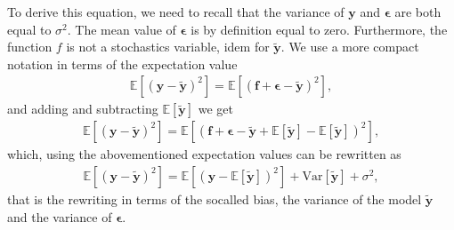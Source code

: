 \documentclass[letterpaper,10pt,english]{sphinxmanual}
\begin{document}
To derive this equation, we need to recall that the variance of \(\boldsymbol{y}\) and \(\boldsymbol{\epsilon}\) are both equal to \(\sigma^2\). The mean value of \(\boldsymbol{\epsilon}\) is by definition equal to zero. Furthermore, the function \(f\) is not a stochastics variable, idem for \(\boldsymbol{\tilde{y}}\).
We use a more compact notation in terms of the expectation value
\begin{equation*}
\begin{split}
\mathbb{E}\left[(\boldsymbol{y}-\boldsymbol{\tilde{y}})^2\right]=\mathbb{E}\left[(\boldsymbol{f}+\boldsymbol{\epsilon}-\boldsymbol{\tilde{y}})^2\right],
\end{split}
\end{equation*}
and adding and subtracting \(\mathbb{E}\left[\boldsymbol{\tilde{y}}\right]\) we get
\begin{equation*}
\begin{split}
\mathbb{E}\left[(\boldsymbol{y}-\boldsymbol{\tilde{y}})^2\right]=\mathbb{E}\left[(\boldsymbol{f}+\boldsymbol{\epsilon}-\boldsymbol{\tilde{y}}+\mathbb{E}\left[\boldsymbol{\tilde{y}}\right]-\mathbb{E}\left[\boldsymbol{\tilde{y}}\right])^2\right],
\end{split}
\end{equation*}
which, using the abovementioned expectation values can be rewritten as
\begin{equation*}
\begin{split}
\mathbb{E}\left[(\boldsymbol{y}-\boldsymbol{\tilde{y}})^2\right]=\mathbb{E}\left[(\boldsymbol{y}-\mathbb{E}\left[\boldsymbol{\tilde{y}}\right])^2\right]+\mathrm{Var}\left[\boldsymbol{\tilde{y}}\right]+\sigma^2,
\end{split}
\end{equation*}
that is the rewriting in terms of the so\sphinxhyphen{}called bias, the variance of the model \(\boldsymbol{\tilde{y}}\) and the variance of \(\boldsymbol{\epsilon}\).
\end{document}
